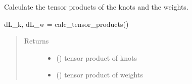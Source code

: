 \documentclass[letterpaper,10pt,english,openany,oneside]{sphinxmanual}
\begin{document}
\begin{fulllineitems}
\begin{fulllineitems}
\end{fulllineitems}


\begin{fulllineitems}
\label{\detokenize{pygpc:pygpc.grid.SparseGrid.calc_tensor_products}}
Calculate the tensor products of the knots and the weights.

dL\_k, dL\_w = calc\_tensor\_products()
\begin{quote}\begin{description}
\item[{Returns}] \leavevmode
\begin{itemize}
\item {} 
 () \textendash{} tensor product of knots

\item {} 
 () \textendash{} tensor product of weights

\end{itemize}


\end{description}\end{quote}

\end{fulllineitems}


\end{fulllineitems}

\end{document}
